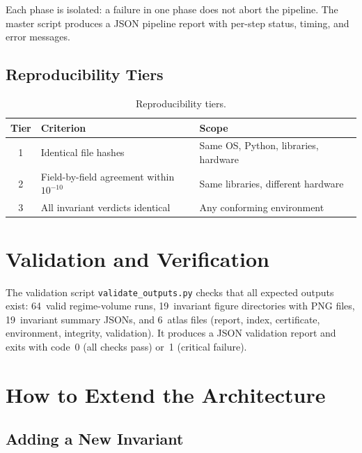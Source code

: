 \documentclass[11pt,twoside,openright]{book}
\theoremstyle{definition}
\theoremstyle{plain}
\theoremstyle{definition}
\theoremstyle{remark}
\begin{document}
Each phase is isolated: a failure in one phase does not abort the pipeline. The master script produces a JSON pipeline report with per-step status, timing, and error messages.

\section{Reproducibility Tiers}

\begin{table}[ht]
\centering
\caption{Reproducibility tiers.}\label{tab:tiers}
\begin{tabular}{@{}clp{5cm}@{}}
\toprule
Tier & Criterion & Scope \\
\midrule
1 & Identical file hashes & Same OS, Python, libraries, hardware \\
2 & Field-by-field agreement within \(10^{-10}\) & Same libraries, different hardware \\
3 & All invariant verdicts identical & Any conforming environment \\
\bottomrule
\end{tabular}
\end{table}


\chapter{Validation and Verification}\label{ch:validation}

The validation script \texttt{validate\_outputs.py} checks that all expected outputs exist: 64~valid regime-volume runs, 19~invariant figure directories with PNG files, 19~invariant summary JSONs, and 6~atlas files (report, index, certificate, environment, integrity, validation). It produces a JSON validation report and exits with code~0 (all checks pass) or~1 (critical failure).


\chapter{How to Extend the Architecture}\label{ch:extension}

\section{Adding a New Invariant}
\end{document}
